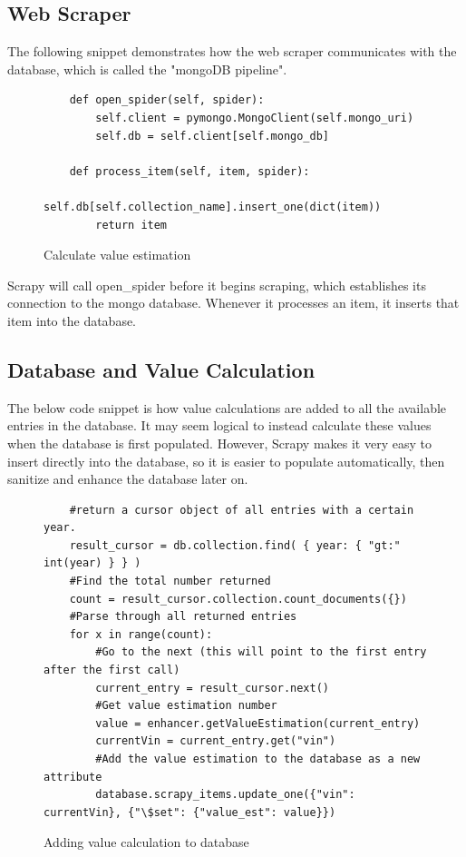 \documentclass[onecolumn, draftclsnofoot,10pt, compsoc]{IEEEtran}
\begin{document}
\subsection{Web Scraper}
The following snippet demonstrates how the web scraper communicates with the database, which is called the "mongoDB pipeline". 

\begin{figure}[H]
\centering
\begin{verbatim}
    def open_spider(self, spider):
        self.client = pymongo.MongoClient(self.mongo_uri)
        self.db = self.client[self.mongo_db]

    def process_item(self, item, spider):
        self.db[self.collection_name].insert_one(dict(item))
        return item
\end{verbatim}
\caption{Calculate value estimation}
\end{figure}
Scrapy will call open\_spider before it begins scraping, which establishes its connection to the mongo database. Whenever it processes an item, it inserts that item into the database. 

\subsection{Database and Value Calculation}
The below code snippet is how value calculations are added to all the available entries in the database. It may seem logical to instead calculate these values when the database is first populated. However, Scrapy makes it very easy to insert directly into the database, so it is easier to populate automatically, then sanitize and enhance the database later on. 
\begin{figure}[H]
\centering
\begin{verbatim}
    #return a cursor object of all entries with a certain year. 
    result_cursor = db.collection.find( { year: { "gt:" int(year) } } )
    #Find the total number returned 
    count = result_cursor.collection.count_documents({})
    #Parse through all returned entries
    for x in range(count):
        #Go to the next (this will point to the first entry after the first call)
        current_entry = result_cursor.next()
        #Get value estimation number
        value = enhancer.getValueEstimation(current_entry)
        currentVin = current_entry.get("vin")
        #Add the value estimation to the database as a new attribute
        database.scrapy_items.update_one({"vin": currentVin}, {"\$set": {"value_est": value}})
\end{verbatim}
\caption{Adding value calculation to database}
\end{figure}
\end{document}

